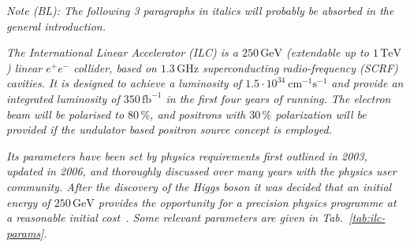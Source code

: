 \documentclass[%
 reprint,
 amsmath,amssymb,
 aps,
]{revtex4-1}
\begin{document}


{\it Note (BL): The following 3 paragraphs in italics will probably be absorbed in the general introduction.}

{\it 
The International Linear Accelerator (ILC) is a $250\,{\mathrm{GeV}}$ (extendable up to $1\,{\mathrm{TeV}}$) linear $e^+e^-$ collider, based on $1.3\,{\mathrm{GHz}}$ superconducting radio-frequency (SCRF) cavities.
It is designed to  achieve a luminosity of $1.5\cdot 10^{34}~{\mathrm{cm}}^{-1}{\mathrm{s}}^{-1}$ and provide an integrated luminosity of $350\,{\mathrm{fb}}^{-1}$ in the first four years of running.
The electron beam will be polarised to $80\,\%$, and positrons with $30\,\%$ polarization will be provided if the undulator based positron source concept is employed. 
}

{\it 
Its parameters have been set by physics requirements first outlined in 2003,
updated in 2006, and thoroughly discussed over many years with the physics user community. 
After the discovery of the Higgs boson it was decided that an initial energy of $250\,{\mathrm{GeV}}$ provides the opportunity for a precision physics programme at a reasonable initial cost~\cite{Evans:2017rvt}.
Some relevant parameters are given in Tab.~\ref{tab:ilc-params}.
}
\end{document}
